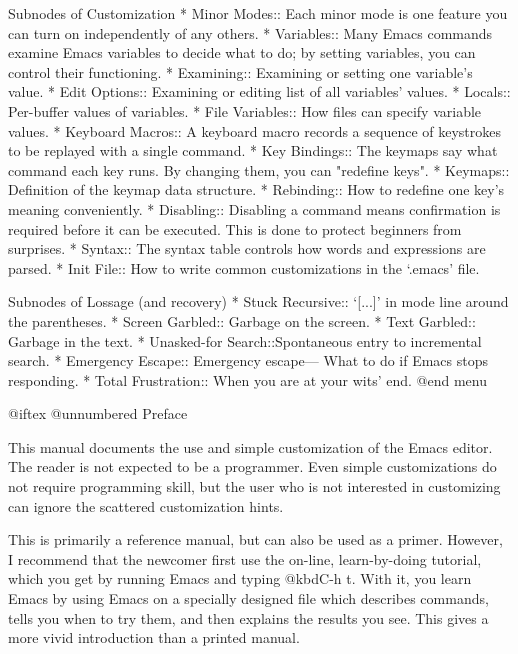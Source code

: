 Subnodes of Customization
* Minor Modes::       Each minor mode is one feature you can turn on
                       independently of any others.
* Variables::         Many Emacs commands examine Emacs variables
                       to decide what to do; by setting variables,
                       you can control their functioning.
* Examining::         Examining or setting one variable's value.
* Edit Options::      Examining or editing list of all variables' values.
* Locals::            Per-buffer values of variables.
* File Variables::    How files can specify variable values.
* Keyboard Macros::   A keyboard macro records a sequence of keystrokes
                       to be replayed with a single command.
* Key Bindings::      The keymaps say what command each key runs.
                       By changing them, you can "redefine keys".
* Keymaps::           Definition of the keymap data structure.
* Rebinding::         How to redefine one key's meaning conveniently.
* Disabling::         Disabling a command means confirmation is required
                       before it can be executed.  This is done to protect
                       beginners from surprises.
* Syntax::            The syntax table controls how words and expressions
                       are parsed.
* Init File::         How to write common customizations in the `.emacs' file.

Subnodes of Lossage (and recovery)
* Stuck Recursive::   `[...]' in mode line around the parentheses.
* Screen Garbled::    Garbage on the screen.
* Text Garbled::      Garbage in the text.
* Unasked-for Search::Spontaneous entry to incremental search.
* Emergency Escape::  Emergency escape---
                       What to do if Emacs stops responding.
* Total Frustration:: When you are at your wits' end.
@end menu

@iftex
@unnumbered Preface

  This manual documents the use and simple customization of the
Emacs editor.  The reader is not expected to be a programmer.  Even simple
customizations do not require programming skill, but the user who is not
interested in customizing can ignore the scattered customization hints.

  This is primarily a reference manual, but can also be used as a
primer.  However, I recommend that the newcomer first use the on-line,
learn-by-doing tutorial, which you get by running Emacs and typing
@kbd{C-h t}.  With it, you learn Emacs by using Emacs on a specially
designed file which describes commands, tells you when to try them,
and then explains the results you see.  This gives a more vivid
introduction than a printed manual.

